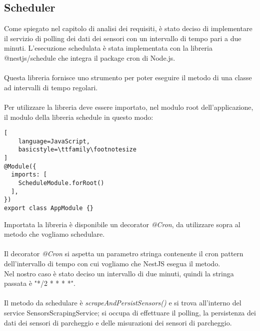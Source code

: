\subsection{Scheduler}
Come spiegato nel capitolo di analisi dei requisiti, è  stato deciso di implementare il servizio di polling dei dati
dei sensori con un intervallo di tempo pari a due minuti. L'esecuzione schedulata è stata implementata con
la libreria @nestjs/schedule che integra il package cron di Node.js.
\\\\
Questa libreria fornisce uno strumento per poter eseguire il metodo
di una classe ad intervalli di tempo regolari.
\\\\
Per utilizzare la libreria deve essere importato, nel modulo root dell'applicazione, il modulo della libreria schedule in questo modo:
\begin{lstlisting}[
    language=JavaScript,
    basicstyle=\ttfamily\footnotesize
]
@Module({
  imports: [
    ScheduleModule.forRoot()
  ],
})
export class AppModule {}
\end{lstlisting}
\leavevmode\newline
Importata la libreria è disponibile un decorator \textit{@Cron}, da utilizzare sopra al metodo che vogliamo schedulare. 
\\\\
Il decorator \textit{@Cron} si aspetta un parametro stringa contenente il cron pattern
dell'intervallo di tempo con cui vogliamo che NestJS esegua il metodo.
\\
Nel nostro caso è stato deciso un intervallo di due minuti, quindi la stringa passata è "*/2 * * * *".
\\\\
Il metodo da schedulare è \textit{scrapeAndPersistSensors()} e si trova all'interno del service SensorsScrapingService; si occupa
di effettuare il polling, la persistenza dei dati dei sensori di parcheggio e delle misurazioni dei sensori di parcheggio.

